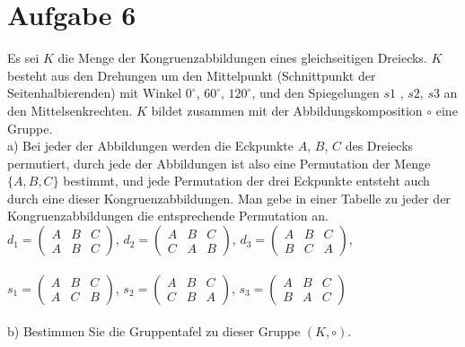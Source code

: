 \section*{Aufgabe 6}

Es sei $K$ die Menge der Kongruenzabbildungen eines gleichseitigen Dreiecks. $K$ besteht aus den Drehungen um den Mittelpunkt (Schnittpunkt der Seitenhalbierenden) mit Winkel $0^{\circ}$, $60^{\circ}$, $120^{\circ}$, und den Spiegelungen $s1$ , $s2$, $s3$ an den Mittelsenkrechten. $K$ bildet zusammen mit der Abbildungskomposition $\circ$ eine Gruppe.\\

a) Bei jeder der Abbildungen werden die Eckpunkte $A$, $B$, $C$ des Dreiecks permutiert, durch jede der Abbildungen ist also eine Permutation der Menge $\{A, B, C\}$ bestimmt, und jede Permutation der drei Eckpunkte entsteht auch durch eine dieser Kongruenzabbildungen. Man gebe in einer Tabelle zu jeder der Kongruenzabbildungen die entsprechende Permutation an.\\

$d_1 = \begin{pmatrix}A & B & C\\A & B & C\end{pmatrix}$, $d_2 = \begin{pmatrix}A & B & C\\C & A & B\end{pmatrix}$, $d_3 = \begin{pmatrix}A & B & C\\B & C & A\end{pmatrix}$,\\~\\

$s_1 = \begin{pmatrix}A & B & C\\A & C & B\end{pmatrix}$, $s_2 = \begin{pmatrix}A & B & C\\C & B & A\end{pmatrix}$, $s_3 = \begin{pmatrix}A & B & C\\B & A & C\end{pmatrix}$\\~\\

b) Bestimmen Sie die Gruppentafel zu dieser Gruppe $(K, \circ)$.


